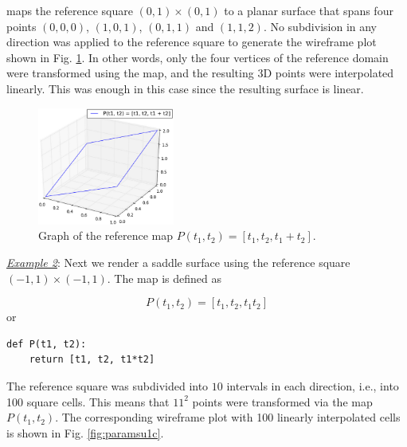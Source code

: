 \noindent
maps the reference square $(0, 1)\times(0, 1)$ to a planar surface that spans
four points $(0, 0, 0)$, $(1, 0, 1)$, $(0, 1, 1)$ and $(1, 1, 2)$. No subdivision in
any direction was applied to the reference square to generate the wireframe plot 
shown in Fig. \ref{fig:paramsu1}. In other words, only the four vertices of the reference domain 
were transformed using the map, and the resulting 3D points were interpolated
linearly. This was enough in this case since the resulting surface is linear.

\begin{figure}[!ht]
\begin{center}
\includegraphics[width=0.4\textwidth]{img/paramsu1.png}
\end{center}
\vspace{-6mm}
\caption{Graph of the reference map $P(t_1, t_2) = [t_1, t_2, t_1 + t_2]$.}
\label{fig:paramsu1}
\end{figure}
\noindent

\noindent
\underline{\em Example 2}: Next we render a saddle surface
using the reference square $(-1, 1)\times(-1, 1)$. 
The map is defined as

$$
P(t_1, t_2) = [t_1, t_2, t_1 t_2]
$$
or\\

\begin{bbox}
\begin{verbatim}
def P(t1, t2):
    return [t1, t2, t1*t2]
\end{verbatim}
\end{bbox}
\vspace{6mm}

\noindent
The reference square was subdivided into $10$ intervals in each direction, i.e., into 
100 square cells. This means that $11^2$ points were transformed via the map $P(t_1, t_2)$.
The corresponding wireframe plot with 100 linearly interpolated cells is shown in Fig. \ref{fig:paramsu1c}. 

